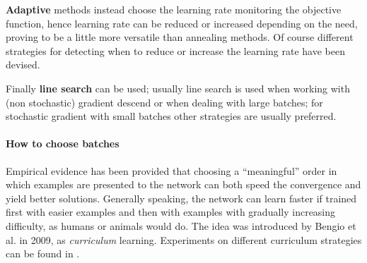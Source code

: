 \textbf{Adaptive} methods instead choose the learning rate monitoring the objective function, hence learning rate can be reduced
or increased depending on the need, proving to be a little more versatile than annealing methods. Of course different strategies for detecting when to reduce or increase the learning rate have been devised.

Finally \textbf{line search} can be used; usually line search is used when working with (non stochastic) gradient 
descend or when dealing with large batches; for stochastic gradient with small batches other strategies are usually 
preferred.

\paragraph{How to choose batches}

Empirical evidence has been provided that choosing a ``meaningful'' order in which examples are presented to the network can both speed the convergence and yield better solutions. Generally speaking, the network can learn faster if trained first with easier examples and then with examples with gradually increasing difficulty, as humans or animals would do. The idea was introduced by Bengio et al.\cite{curriculumLearning} in 2009, as \textit{curriculum} learning. Experiments on different curriculum strategies can be found in \cite{learningToExecute}.

